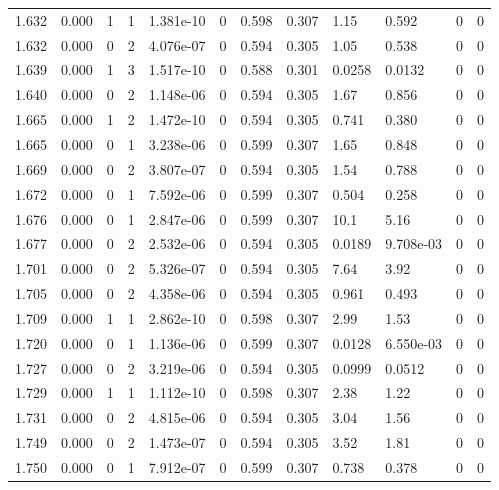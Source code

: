 \documentclass[preview]{standalone}
\begin{document}
{{{{\begin{tabular}{L{1.2cm}C{1.2cm} C{0.3cm}C{0.5cm} C{1.4cm}C{1.4cm} C{1.4cm}C{1.4cm} C{1.6cm}C{1.6cm} C{1.6cm}C{1.6cm}}
  1.632  &  0.000  & 1     &  1 &  1.381e-10  & 0  &  0.598&   0.307& 1.15 & 0.592   &  0 & 0  \\ 
  1.632  &  0.000  & 0     &  2 &  4.076e-07  & 0  &  0.594&   0.305& 1.05 & 0.538   &  0 & 0  \\ 
  1.639  &  0.000  & 1     &  3 &  1.517e-10  & 0  &  0.588&   0.301& 0.0258 & 0.0132   &  0 & 0  \\ 
  1.640  &  0.000  & 0     &  2 &  1.148e-06  & 0  &  0.594&   0.305& 1.67 & 0.856   &  0 & 0  \\ 
  1.665  &  0.000  & 1     &  2 &  1.472e-10  & 0  &  0.594&   0.305& 0.741 & 0.380   &  0 & 0  \\ 
  1.665  &  0.000  & 0     &  1 &  3.238e-06  & 0  &  0.599&   0.307& 1.65 & 0.848   &  0 & 0  \\ 
  1.669  &  0.000  & 0     &  2 &  3.807e-07  & 0  &  0.594&   0.305& 1.54 & 0.788   &  0 & 0  \\ 
  1.672  &  0.000  & 0     &  1 &  7.592e-06  & 0  &  0.599&   0.307& 0.504 & 0.258   &  0 & 0  \\ 
  1.676  &  0.000  & 0     &  1 &  2.847e-06  & 0  &  0.599&   0.307& 10.1 & 5.16   &  0 & 0  \\ 
  1.677  &  0.000  & 0     &  2 &  2.532e-06  & 0  &  0.594&   0.305& 0.0189 & 9.708e-03   &  0 & 0  \\ 
  1.701  &  0.000  & 0     &  2 &  5.326e-07  & 0  &  0.594&   0.305& 7.64 & 3.92   &  0 & 0  \\ 
  1.705  &  0.000  & 0     &  2 &  4.358e-06  & 0  &  0.594&   0.305& 0.961 & 0.493   &  0 & 0  \\ 
  1.709  &  0.000  & 1     &  1 &  2.862e-10  & 0  &  0.598&   0.307& 2.99 & 1.53   &  0 & 0  \\ 
  1.720  &  0.000  & 0     &  1 &  1.136e-06  & 0  &  0.599&   0.307& 0.0128 & 6.550e-03   &  0 & 0  \\ 
  1.727  &  0.000  & 0     &  2 &  3.219e-06  & 0  &  0.594&   0.305& 0.0999 & 0.0512   &  0 & 0  \\ 
  1.729  &  0.000  & 1     &  1 &  1.112e-10  & 0  &  0.598&   0.307& 2.38 & 1.22   &  0 & 0  \\ 
  1.731  &  0.000  & 0     &  2 &  4.815e-06  & 0  &  0.594&   0.305& 3.04 & 1.56   &  0 & 0  \\ 
  1.749  &  0.000  & 0     &  2 &  1.473e-07  & 0  &  0.594&   0.305& 3.52 & 1.81   &  0 & 0  \\ 
  1.750  &  0.000  & 0     &  1 &  7.912e-07  & 0  &  0.599&   0.307& 0.738 & 0.378   &  0 & 0  \\ 

\end{tabular}}}}}
\end{document}
